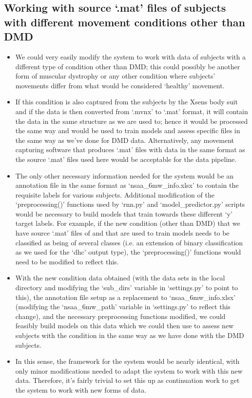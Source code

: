 \documentclass[12pt,twoside]{report}
\begin{document}
\subsection{Working with source ‘.mat’ files of subjects with different movement conditions other than DMD}
\begin{itemize}
	\item We could very easily modify the system to work with data of subjects with a different type of condition other than DMD; this could possibly be another form of muscular dystrophy or any other condition where subjects’ movements differ from what would be considered ‘healthy’ movement.
	\item If this condition is also captured from the subjects by the Xsens body suit and if the data is then converted from ‘.mvnx’ to ‘.mat’ format, it will contain the data in the same structure as we are used to; hence it would be processed the same way and would be used to train models and assess specific files in the same way as we’ve done for DMD data. Alternatively, any movement capturing software that produces ‘.mat’ files with data in the same format as the source ‘.mat’ files used here would be acceptable for the data pipeline.
	\item The only other necessary information needed for the system would be an annotation file in the same format as ‘nsaa\_6mw\_info.xlsx’ to contain the requisite labels for various subjects. Additional modification of the ‘preprocessing()’ functions used by ‘rnn.py’ and ‘model\_predictor.py’ scripts would be necessary to build models that train towards these different ‘y’ target labels. For example, if the new condition (other than DMD) that we have source ‘.mat’ files of and that are used to train models needs to be classified as being of several classes (i.e. an extension of binary classification as we used for the ‘dhc’ output type), the ‘preprocessing()’ functions would need to be modified to reflect this.
	\item With the new condition data obtained (with the data sets in the local directory and modifying the ‘sub\_dirs’ variable in ‘settings.py’ to point to this), the annotation file setup as a replacement to ‘nsaa\_6mw\_info.xlsx’ (modifying the ‘nsaa\_6mw\_path’ variable in ‘settings.py’ to reflect this change), and the necessary preprocessing functions modified, we could feasibly build models on this data which we could then use to assess new subjects with the condition in the same way as we have done with the DMD subjects.
	\item In this sense, the framework for the system would be nearly identical, with only minor modifications needed to adapt the system to work with this new data. Therefore, it’s fairly trivial to set this up as continuation work to get the system to work with new forms of data.
\end{itemize}
\end{document}
